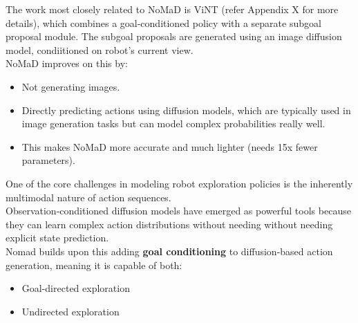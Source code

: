 \documentclass[12pt]{article}
\begin{document}
\begin{appendices}
The work most closely related to NoMaD is ViNT (refer Appendix X for more details), which combines a goal-conditioned policy with a separate subgoal proposal module. The subgoal proposals are generated using an image diffusion model, condiitioned on robot's current view.\\
NoMaD improves on this by:
\begin{itemize}
    \item Not generating images.
    \item Directly predicting actions using diffusion models, which are typically used in image generation tasks but can model complex probabilities really well.
    \item This makes NoMaD more accurate and much lighter (needs 15x fewer parameters).
\end{itemize}
One of the core challenges in modeling robot exploration policies is the inherently multimodal nature of action sequences.\\
Observation-conditioned diffusion models  have emerged as powerful tools because they can learn complex action distributions without needing without needing explicit state prediction.\\
Nomad builds upon this adding \textbf{goal conditioning} to diffusion-based action generation, meaning it is capable of both:
\begin{itemize}
    \item Goal-directed exploration
    \item Undirected exploration 
\end{itemize}


\end{appendices}
\end{document}
